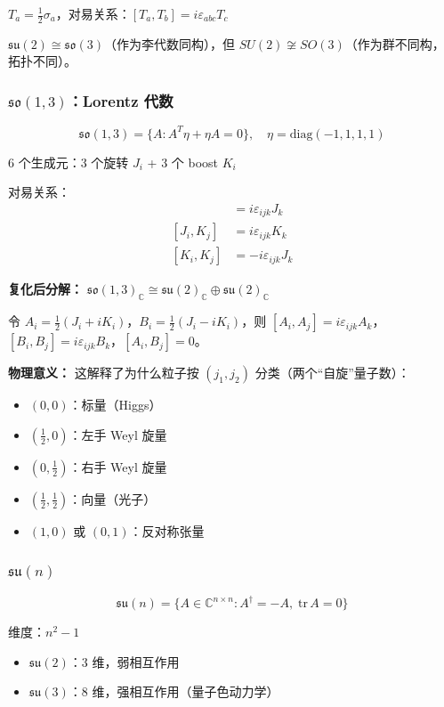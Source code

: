 $T_a = \frac{1}{2}\sigma_a$，对易关系：$[T_a, T_b] = i\varepsilon_{abc}T_c$

\textbf{$\mathfrak{su}(2) \cong \mathfrak{so}(3)$}（作为李代数同构），但 $SU(2) \not\cong SO(3)$（作为群不同构，拓扑不同）。

\subsubsection{$\mathfrak{so}(1,3)$：Lorentz 代数}

\[
\mathfrak{so}(1,3) = \{A : A^T\eta + \eta A = 0\}, \quad \eta = \text{diag}(-1,1,1,1)
\]

6 个生成元：3 个旋转 $J_i$ + 3 个 boost $K_i$

对易关系：
\begin{align*}
[J_i, J_j] &= i\varepsilon_{ijk}J_k \\
[J_i, K_j] &= i\varepsilon_{ijk}K_k \\
[K_i, K_j] &= -i\varepsilon_{ijk}J_k
\end{align*}

\textbf{复化后分解：} $\mathfrak{so}(1,3)_\mathbb{C} \cong \mathfrak{su}(2)_\mathbb{C} \oplus \mathfrak{su}(2)_\mathbb{C}$

令 $A_i = \frac{1}{2}(J_i + iK_i)$，$B_i = \frac{1}{2}(J_i - iK_i)$，则 $[A_i, A_j] = i\varepsilon_{ijk}A_k$，$[B_i, B_j] = i\varepsilon_{ijk}B_k$，$[A_i, B_j] = 0$。

\textbf{物理意义：} 这解释了为什么粒子按 $(j_1, j_2)$ 分类（两个“自旋”量子数）：
\begin{itemize}
  \item $(0, 0)$：标量（Higgs）
  \item $(\frac{1}{2}, 0)$：左手 Weyl 旋量
  \item $(0, \frac{1}{2})$：右手 Weyl 旋量
  \item $(\frac{1}{2}, \frac{1}{2})$：向量（光子）
  \item $(1, 0)$ 或 $(0, 1)$：反对称张量
\end{itemize}

\subsubsection{$\mathfrak{su}(n)$}

\[
\mathfrak{su}(n) = \{A \in \mathbb{C}^{n\times n} : A^\dagger = -A,\; \text{tr}\,A = 0\}
\]

维度：$n^2 - 1$

\begin{itemize}
  \item $\mathfrak{su}(2)$：3 维，弱相互作用
  \item $\mathfrak{su}(3)$：8 维，强相互作用（量子色动力学）
\end{itemize}

